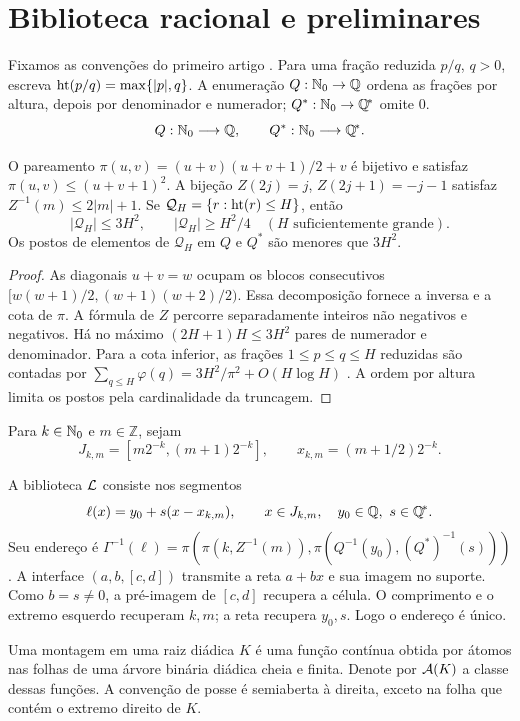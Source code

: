 \section{Biblioteca racional e preliminares}
\label{artigo_2:sec:indexing}\label{artigo_2:sec:generator}\label{artigo_2:sec:assemblies}
Fixamos as convenções do primeiro artigo \citep{artigo_2-oliveiraI}. Para uma fração reduzida $p/q$, $q>0$, escreva $\operatorname{ht}(p/q)=\max\{|p|,q\}$. A enumeração $Q:\mathbb{N}_0\to\mathbb Q$ ordena as frações por altura, depois por denominador e numerador; $Q^*:\mathbb{N}_0\to\mathbb{Q}^{\!*}$ omite $0$.
\begin{equation}
 Q:\mathbb{N}_0\longrightarrow\mathbb Q,\qquad Q^*:\mathbb{N}_0\longrightarrow\mathbb{Q}^{\!*}.
 \label{artigo_2:eq:q-enums}
\end{equation}
\begin{lemma}\label{map:artigo_2:2.1}
\label{artigo_2:lem:cantor}\label{artigo_2:lem:integers}\label{artigo_2:lem:rational-count}\label{artigo_2:lem:rational-rank}
O pareamento $\pi(u,v)=(u+v)(u+v+1)/2+v$ é bijetivo e satisfaz $\pi(u,v)\le(u+v+1)^2$. A bijeção $Z(2j)=j$, $Z(2j+1)=-j-1$ satisfaz $Z^{-1}(m)\le2|m|+1$. Se $\mathcal Q_H=\{r:\operatorname{ht}(r)\le H\}$, então
\[
 |\mathcal Q_H|\le3H^2,\qquad |\mathcal Q_H|\ge H^2/4\quad(H\text{ suficientemente grande}).
\]
Os postos de elementos de $\mathcal Q_H$ em $Q$ e $Q^*$ são menores que $3H^2$.
\end{lemma}
\begin{proof}
As diagonais $u+v=w$ ocupam os blocos consecutivos $[w(w+1)/2,(w+1)(w+2)/2)$. Essa decomposição fornece a inversa e a cota de $\pi$. A fórmula de $Z$ percorre separadamente inteiros não negativos e negativos. Há no máximo $(2H+1)H\le3H^2$ pares de numerador e denominador. Para a cota inferior, as frações $1\le p\le q\le H$ reduzidas são contadas por $\sum_{q\le H}\varphi(q)=3H^2/\pi^2+O(H\log H)$ \citep{artigo_1-hardy2008}. A ordem por altura limita os postos pela cardinalidade da truncagem.
\end{proof}

Para $k\in\mathbb{N}_0$ e $m\in\mathbb Z$, sejam
\[
 J_{k,m}=[m2^{-k},(m+1)2^{-k}],\qquad x_{k,m}=(m+1/2)2^{-k}.
\]
\begin{definition}\label{map:artigo_2:2.2}\label{artigo_2:def:assembly}\label{artigo_2:thm:dictionary}\label{artigo_2:lem:cell-recovery}
A biblioteca $\mathcal{L}$ consiste nos segmentos
\[
 \ell(x)=y_0+s(x-x_{k,m}),\qquad x\in J_{k,m},\quad y_0\in\mathbb Q,\ s\in\mathbb{Q}^{\!*}.
\]
Seu endereço é $\Gamma^{-1}(\ell)=\pi(\pi(k,Z^{-1}(m)),\pi(Q^{-1}(y_0),(Q^*)^{-1}(s)))$. A interface $(a,b,[c,d])$ transmite a reta $a+bx$ e sua imagem no suporte. Como $b=s\ne0$, a pré-imagem de $[c,d]$ recupera a célula. O comprimento e o extremo esquerdo recuperam $k,m$; a reta recupera $y_0,s$. Logo o endereço é único.

Uma montagem em uma raiz diádica $K$ é uma função contínua obtida por átomos nas folhas de uma árvore binária diádica cheia e finita. Denote por $\mathcal{A}(K)$ a classe dessas funções. A convenção de posse é semiaberta à direita, exceto na folha que contém o extremo direito de $K$.
\end{definition}

